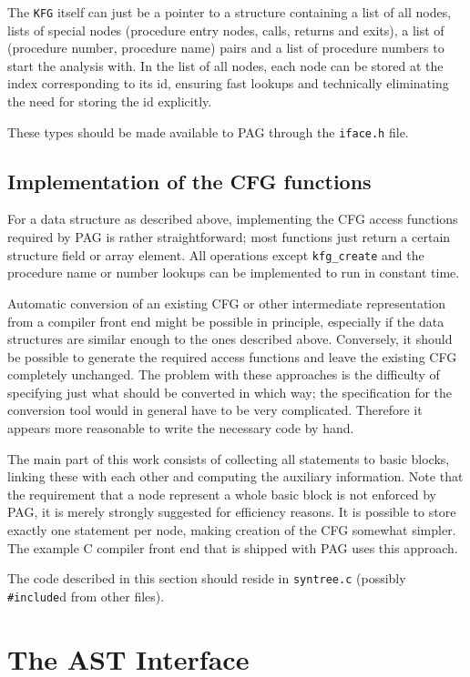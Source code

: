 The \verb|KFG| itself can just be a pointer to a structure
containing a list of all nodes, lists of special nodes (procedure
entry nodes, calls, returns and exits), a list of (procedure number,
procedure name) pairs and a list of procedure numbers to start the
analysis with. In the list of all nodes, each node can be stored at
the index corresponding to its id, ensuring fast lookups and
technically eliminating the need for storing the id explicitly.

These types should be made available to PAG through the
\verb|iface.h| file.

\subsection{Implementation of the CFG functions}

For a data structure as described above, implementing the CFG access
functions required by PAG is rather straightforward; most functions
just return a certain structure field or array element. All operations
except \verb|kfg_create| and the procedure name or number lookups
can be implemented to run in constant time.

Automatic conversion of an existing CFG or other intermediate
representation from a compiler front end might be possible in
principle, especially if the data structures are similar enough to
the ones described above. Conversely, it should be possible to
generate the required access functions and leave the existing CFG
completely unchanged. The problem with these approaches is the
difficulty of specifying just what should be converted in which way;
the specification for the conversion tool would in general have to
be very complicated. Therefore it appears more reasonable to write
the necessary code by hand.

The main part of this work consists of collecting all statements to
basic blocks, linking these with each other and computing the
auxiliary information. Note that the requirement that a node
represent a whole basic block is not enforced by PAG, it is merely
strongly suggested for efficiency reasons. It is possible to store
exactly one statement per node, making creation of the CFG somewhat
simpler. The example C compiler front end that is shipped with PAG
uses this approach.

The code described in this section should reside in \verb|syntree.c|
(possibly \verb|#include|d from other files).

\section{The AST Interface}

